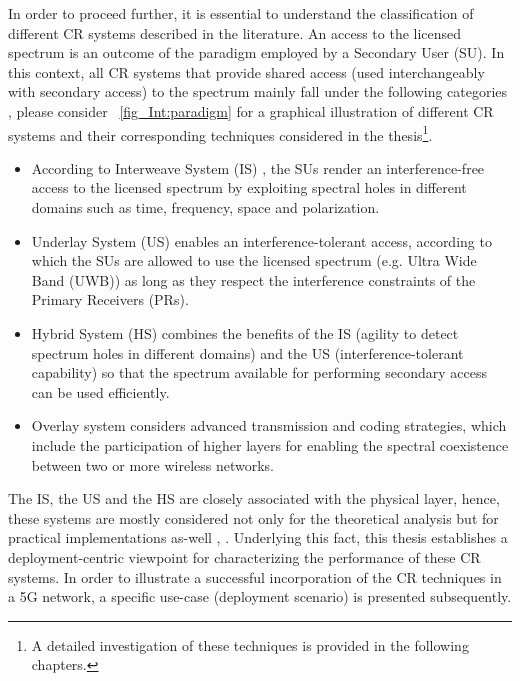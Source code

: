In order to proceed further, it is essential to understand the classification of different CR systems described in the literature. An access to the licensed spectrum is an outcome of the paradigm employed by a Secondary User (SU). In this context, all CR systems that provide shared access (used interchangeably with secondary access) to the spectrum mainly fall under the following categories \cite{Goldsmith09}, please consider \figurename~\ref{fig_Int:paradigm} for a graphical illustration of different CR systems and their corresponding techniques considered in the thesis\footnote{A detailed investigation of these techniques is provided in the following chapters.}. 
\begin{itemize}
\item According to Interweave System (IS) , the SUs render an interference-free access to the licensed spectrum by exploiting spectral holes in different domains such as time, frequency, space and polarization. 
\item Underlay System (US)  enables an interference-tolerant access, according to which the SUs are allowed to use the licensed spectrum (e.g. Ultra Wide Band (UWB)) as long as they respect the interference constraints of the Primary Receivers (PRs). 
\item Hybrid System (HS)  combines the benefits of the IS (agility to detect spectrum holes in different domains) and the US (interference-tolerant capability) so that the spectrum available for performing secondary access can be used efficiently.  
\item Overlay system  considers advanced transmission and coding strategies, which include the participation of higher layers for enabling the spectral coexistence between two or more wireless networks. 
\end{itemize}
The IS, the US and the HS are closely associated with the physical layer, hence, these systems are mostly considered not only for the theoretical analysis but for practical implementations as-well , \cite{Cabric04, Cabric06, Kim10}. 
Underlying this fact, this thesis establishes a deployment-centric viewpoint for characterizing the performance of these CR systems. In order to illustrate a successful incorporation of the CR techniques in a 5G network, a specific use-case (deployment scenario) is presented subsequently. 


